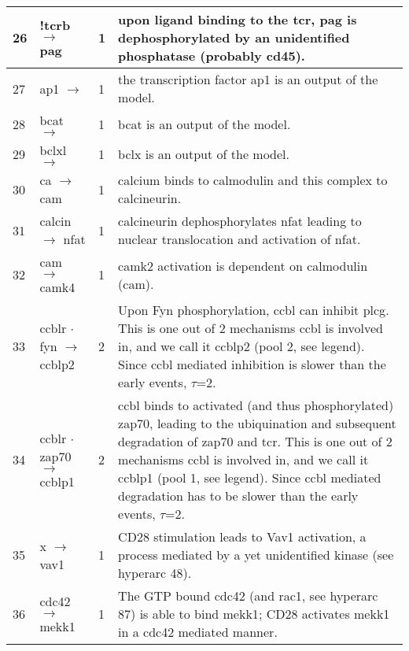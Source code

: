 \documentclass[a4paper, 12pt,epsfig, onecolumn]{article}
\newcommand{\mydot}{\hspace{-0mm} $\cdot$  \hspace{-0mm}}
\begin{document}
{\begin{center}
\begin{longtable}{|p{}|p{}|p{}|p{}|}
26& !tcrb $\rightarrow$ pag                               &1& upon ligand binding to the tcr, pag is dephosphorylated by an unidentified phosphatase (probably cd45)\cite{DavidsonD_MCB_03}. \\ \hline
27& ap1 $\rightarrow$                                     &1& the transcription factor ap1 is an output of the model. \\ \hline
28& bcat $\rightarrow$                            &1& bcat is an output of the model. \\ \hline
29& bclxl $\rightarrow$                                     &1& bclx is an output of the model. \\ \hline
30& ca $\rightarrow$ cam                    &1& calcium binds to calmodulin and this complex to calcineurin\cite{Feske_NI_2001}. \\ \hline
31& calcin $\rightarrow$ nfat                        &1& calcineurin dephosphorylates nfat leading to  nuclear translocation and activation of nfat\cite{Huang_JBC_04,macian:2005,Krauss}.\\ \hline
32& cam $\rightarrow$ camk4             &1& camk2 activation is dependent on calmodulin (cam)\cite{Anderson_Biometals_1998}. \\ \hline
33& ccblr\mydot fyn $\rightarrow$ ccblp2                  &2& Upon Fyn phosphorylation, ccbl can inhibit  plcg\cite{Rellahan_ECR_03}. This is one out of 2 mechanisms ccbl is        involved in, and we call it ccblp2 (pool 2, see legend)\phantom{\emph{}}. Since ccbl mediated inhibition is slower than the early events, $\tau$=2. \\ \hline
34& ccblr\mydot zap70 $\rightarrow$ ccblp1  &2& ccbl binds to activated (and thus phosphorylated) zap70, leading to the ubiquination and subsequent degradation of zap70 and tcr\cite{RaoN_JImm_00}.  This is one out of 2 mechanisms ccbl is involved in, and we call it ccblp1 (pool 1, see legend)\phantom{\emph{}}. Since ccbl mediated degradation has to be slower than the early events, $\tau$=2. \\ \hline
35& x $\rightarrow$ vav1                   &1& CD28 stimulation leads to Vav1 activation\cite{MichelF_Jimmunol_00,Raab2001,HehnerSP_JBC_00,Kovacs2005}, a process mediated by a yet unidentified kinase (see hyperarc 48). \\ \hline
36& cdc42 $\rightarrow$ mekk1              &1& The GTP         bound cdc42 (and rac1, see hyperarc 87) is able to bind mekk1\cite{FangerGR_EMBO_1997}; CD28 activates mekk1  in a  cdc42 mediated manner\cite{Kaga_JI_1998}. \\ \hline

\end{longtable}
\end{center}}
\end{document}
